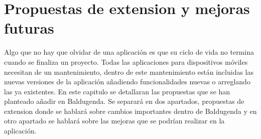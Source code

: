 \chapter{Propuestas de extension y mejoras futuras}

Algo que no hay que olvidar de una aplicación es que su ciclo de vida no termina cuando se finaliza un proyecto. Todas las aplicaciones para dispositivos móviles necesitan de un mantenimiento, dentro de este mantenimiento están incluidas las nuevas versiones de la aplicación añadiendo funcionalidades nuevas o arreglando las ya existentes.
En este capitulo se detallaran las propuestas que se han planteado añadir en Baldugenda.
Se separará en dos apartados, propuestas de extension donde se hablará sobre cambios importantes dentro de Baldugenda y en otro apartado se hablará sobre las mejoras que se podrían realizar en la aplicación.
\newpage

